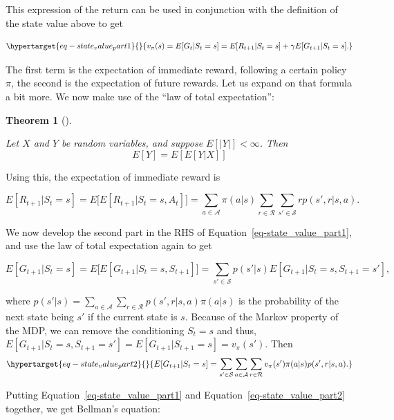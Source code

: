 \documentclass[
  letterpaper,
]{report}
\theoremstyle{plain}
\newtheorem{theorem}{Theorem}[chapter]
\theoremstyle{definition}
\theoremstyle{definition}
\theoremstyle{remark}
\begin{document}
This expression of the return can be used in conjunction with the
definition of the state value above to get

\begin{equation}\protect\hypertarget{eq-state_value_part1}{}{
v_\pi(s) = E[G_t|S_t = s]= E[R_{t+1}| S_t = s] + \gamma E[G_{t+1} | S_t = s].
}\label{eq-state_value_part1}\end{equation}

The first term is the expectation of immediate reward, following a
certain policy \(\pi\), the second is the expectation of future rewards.
Let us expand on that formula a bit more. We now make use of the ``law
of total expectation'':

\leavevmode{}%
\begin{theorem}[]\label{thm-total_expectation}

Let \(X\) and \(Y\) be random variables, and suppose \(E[|Y|]<\infty\).
Then \[
E[Y] = E\left[E[Y|X]\right]
\]

\end{theorem}

Using this, the expectation of immediate reward is

\[
E[R_{t+1}| S_t = s] = E\big[E[R_{t+1}|S_t = s,A_t]\big] = \sum_{a\in\mathcal{A}}\pi(a|s)\sum_{r\in\mathcal{R}} \sum_{s'\in \mathcal{S}}rp(s',r|s,a).
\]

We now develop the second part in the RHS of
Equation~\ref{eq-state_value_part1}, and use the law of total
expectation again to get

\[
E[G_{t+1} | S_t = s] = E\big[E[G_{t+1} | S_t = s , S_{t+1}]\big] = \sum_{s'\in\mathcal{S}}p(s'|s)E[G_{t+1}|S_t = s, S_{t+1} = s'],
\]

where
\(p(s'|s) = \sum_{a\in\mathcal{A}} \sum_{r\in\mathcal{R}}p(s',r|s,a)\pi(a|s)\)
is the probability of the next state being \(s'\) if the current state
is \(s\). Because of the Markov property of the MDP, we can remove the
conditioning \(S_t = s\) and thus,
\(E[G_{t+1}|S_t = s, S_{t+1} = s'] = E[G_{t+1}|S_{t+1} = s] = v_\pi(s')\).
Then \begin{equation}\protect\hypertarget{eq-state_value_part2}{}{
E[G_{t+1} | S_t = s] = \sum_{s'\in\mathcal{S}}\sum_{a\in\mathcal{A}}\sum_{r\in\mathcal{R}}v_\pi(s')\pi(a|s)p(s',r|s,a).
}\label{eq-state_value_part2}\end{equation}

Putting Equation~\ref{eq-state_value_part1} and
Equation~\ref{eq-state_value_part2} together, we get Bellman's equation:
\end{document}
